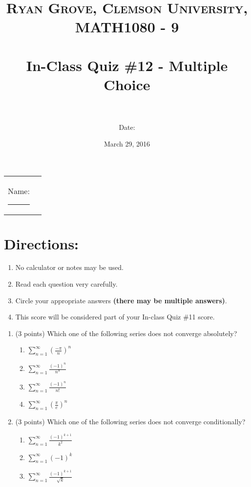 \documentclass[paper=a4, fontsize=11pt]{scrartcl} %
\title{	
\normalfont \normalsize 
\textsc{Ryan Grove, Clemson University, MATH1080 - 9} \\ [25pt] %
\horrule{0.5pt} \\[0.4cm] %
\huge In-Class Quiz \#12 - Multiple Choice \\ %
\horrule{2pt} \\[0.5cm] %
}
\author{Date:} %
\date{\normalsize March 29, 2016} %
\numberwithin{equation}{section} %
\numberwithin{figure}{section} %
\numberwithin{table}{section} %
\begin{document}
\maketitle %

\begin{flushleft}
\begin{tabular}{l l}
Name: \rule{3.2in}{.01cm}  & {}%
\end{tabular}
\end{flushleft}


\section*{\textbf{Directions:}}
\begin{enumerate}
\item No calculator or notes may be used.
\item Read each question very carefully.
\item Circle your appropriate answers \textbf{(there may be multiple answers)}.
\item This score will be considered part of your In-class Quiz \#11 score.
\end{enumerate}
    \vspace{0.5in}
\newpage
\begin{enumerate}
\item (3 points) Which one of the following series does not converge absolutely?
\vspace{2mm}
 \normalsize \begin{enumerate}
    \item $\sum\limits_{n=1}^\infty \left( \frac{-\pi}{n} \right)^n$
    \item $\sum\limits_{n=1}^\infty \frac{(-1)^n}{n^\pi} $
    \item $\sum\limits_{n=1}^\infty \frac{(-1)^n}{n!} $
    \item $\boxed{\sum\limits_{n=1}^\infty \left( \frac{\pi}{e} \right)^n}$
  \end{enumerate}
  \vspace{2in}
\item (3 points) Which one of the following series does not converge conditionally?
\vspace{2mm}
 \normalsize \begin{enumerate}
    \item $\boxed{\sum\limits_{n=1}^\infty \frac{(-1)^{k+1}}{k^2}}$
    \item $\boxed{\sum\limits_{n=1}^\infty (-1)^{k}}$
    \item $\sum\limits_{n=1}^\infty \frac{(-1)^{k+1}}{\sqrt{k}}$
  \end{enumerate}

\end{enumerate}




\end{document}

